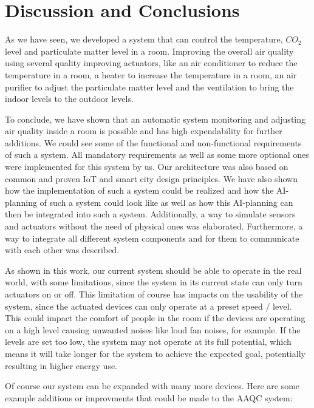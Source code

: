 \section{Discussion and Conclusions}\label{sec:discussion-and-conclusions}

As we have seen, we developed a system that can control the temperature, $CO_2$ level and particulate matter level in a room.
Improving the overall air quality using several quality improving actuators, like an air conditioner to reduce the temperature in a room, a heater to increase the temperature in a room, an air purifier to adjust the particulate matter level and the ventilation to bring the indoor levels to the outdoor levels.

To conclude, we have shown that an automatic system monitoring and adjusting air quality inside a room is possible and has high expendability for further additions.
We could see some of the functional and non-functional requirements of such a system.
All mandatory requirements as well as some more optional ones were implemented for this system by us.
Our architecture was also based on common and proven IoT and smart city design principles.
We have also shown how the implementation of such a system could be realized and how the AI-planning of such a system could look like as well as how this AI-planning can then be integrated into such a system.
Additionally, a way to simulate sensors and actuators without the need of physical ones was elaborated.
Furthermore, a way to integrate all different system components and for them to communicate with each other was described.

As shown in this work, our current system should be able to operate in the real world, with some limitations, since the system in its current state can only turn actuators on or off.
This limitation of course has impacts on the usability of the system, since the actuated devices can only operate at a preset speed / level.
This could impact the comfort of people in the room if the devices are operating on a high level causing unwanted noises like loud fan noises, for example.
If the levels are set too low, the system may not operate at its full potential, which means it will take longer for the system to achieve the expected goal, potentially resulting in higher energy use.

Of course our system can be expanded with many more devices.
Here are some example additions or improvments that could be made to the AAQC system:

